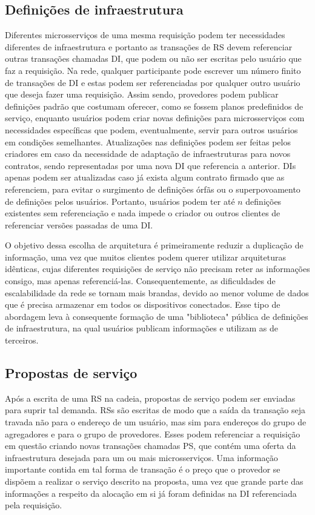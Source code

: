 \subsection{Definições de infraestrutura}
\label{subsec:proposta:contratual:di}
%
Diferentes microsserviços de uma mesma requisição podem ter necessidades diferentes de infraestrutura e portanto as transações de \ac{RS} devem referenciar outras transações chamadas \ac{DI}, que podem ou não ser escritas pelo usuário que faz a requisição. Na rede, qualquer participante pode escrever um número finito de transações de \ac{DI} e estas podem ser referenciadas por qualquer outro usuário que deseja fazer uma requisição. Assim sendo, provedores podem publicar definições padrão que costumam oferecer, como se fossem planos predefinidos de serviço, enquanto usuários podem criar novas definições para microsserviços com necessidades específicas que podem, eventualmente, servir para outros usuários em condições semelhantes. Atualizações nas definições podem ser feitas pelos criadores em caso da necessidade de adaptação de infraestruturas para novos contratos, sendo representadas por uma nova \ac{DI} que referencia a anterior. \acp{DI} apenas podem ser atualizadas caso já exista algum contrato firmado que as referenciem, para evitar o surgimento de definições órfãs ou o superpovoamento de definições pelos usuários. Portanto, usuários podem ter até $n$ definições existentes sem referenciação e nada impede o criador ou outros clientes de referenciar versões passadas de uma \ac{DI}.

%
O objetivo dessa escolha de arquitetura é primeiramente reduzir a duplicação de informação, uma vez que muitos clientes podem querer utilizar arquiteturas idênticas, cujas diferentes requisições de serviço não precisam reter as informações consigo, mas apenas referenciá-las. Consequentemente, as dificuldades de escalabilidade da rede se tornam mais brandas, devido ao menor volume de dados que é precisa armazenar em todos os dispositivos conectados. Esse tipo de abordagem leva à consequente formação de uma "biblioteca" pública de definições de infraestrutura, na qual usuários publicam informações e utilizam as de terceiros.

%
\subsection{Propostas de serviço}
\label{subsec:proposta:contratual:PS}

Após a escrita de uma \ac{RS} na cadeia, propostas de serviço podem ser enviadas para suprir tal demanda. \acp{RS} são escritas de modo que a saída da transação seja travada não para o endereço de um usuário, mas sim para endereços do grupo de agregadores e para o grupo de provedores. Esses podem referenciar a requisição em questão criando novas transações chamadas \ac{PS}, que contém uma oferta da infraestrutura desejada para um ou mais microsserviços. Uma informação importante contida em tal forma de transação é o preço que o provedor se dispõem a realizar o serviço descrito na proposta, uma vez que grande parte das informações a respeito da alocação em si já foram definidas na \ac{DI} referenciada pela requisição.

